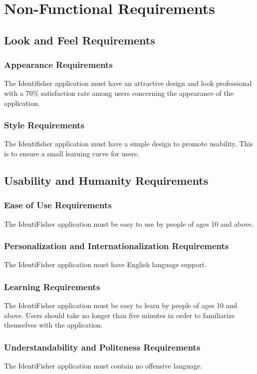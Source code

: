 \documentclass{article}
\begin{document}
\section{Non-Functional Requirements}

\subsection{Look and Feel Requirements}
\subsubsection{Appearance Requirements}
The Identifisher application must have an attractive design and look professional with a 70\% satisfaction rate among users concerning the appearance of the application.
\subsubsection{Style Requirements}
The Identifisher application must have a simple design to promote usability. This is to ensure a small learning curve for users.

\subsection{Usability and Humanity Requirements}
\subsubsection{Ease of Use Requirements}
The IdentiFisher application must be easy to use by people of ages 10 and above.
\subsubsection{Personalization and Internationalization Requirements}
The IdentiFisher application must have English language support.
\subsubsection{Learning Requirements}
The IdentiFisher application must be easy to learn by people of ages 10 and above. Users should take no longer than five minutes in order to familiarize themselves with the application.
\subsubsection{Understandability and Politeness Requirements}
The IdentiFisher application must contain no offensive language.
\end{document}
